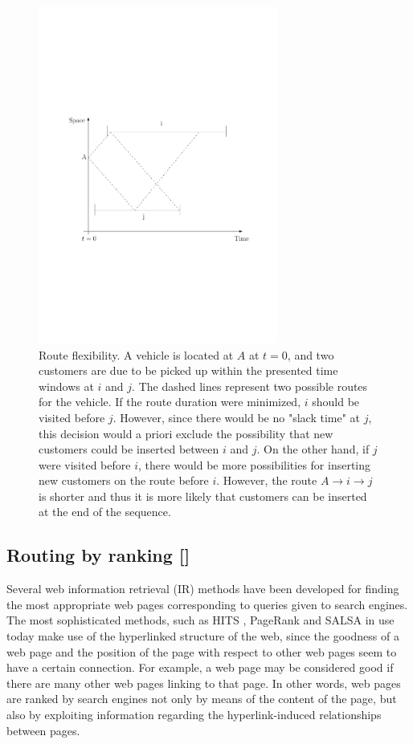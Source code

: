 \documentclass[dissertation,draft*]{aaltoseries}
\begin{document}
\begin{figure}[ht]
\begin{center}
\includegraphics[width=0.7\textwidth]{flexibility03.pdf}
\caption{Route flexibility. A vehicle is located at $A$ at $t = 0$,
and two customers are due to be picked up within the presented time windows at $i$ and $j$.
The dashed lines represent two possible routes for the vehicle.
If the route duration were minimized, $i$ should be visited before $j$. However, since
there would be no "slack time" at $j$, this decision would a priori 
exclude the possibility that new customers could be inserted between $i$ and $j$. 
On the other hand, if $j$ were visited before $i$, there would be
more possibilities for inserting new customers on the route before $i$. However, 
the route $A \to i \to j$ is shorter and thus it is more likely that 
customers can be inserted at the end of the sequence.}
\label{flexibility01}
\end{center}
\end{figure}



\subsection{Routing by ranking []}
\label{routingbyranking}
Several web information retrieval (IR) methods have been developed
for finding the most appropriate web pages corresponding to 
queries given to search engines. The most sophisticated methods, such as HITS \cite{kleinberg}, PageRank \cite{brin01} and SALSA \cite{lempel}
in use today make use of the hyperlinked structure of the web, since
the goodness of a web page and the position of the page with respect to
other web pages seem to have a certain connection. 
For example, a web page may be
considered good if there are many other web pages linking to that page. In other words, 
web pages are ranked by search engines not only by means of the content of the page, but
also by exploiting information regarding the hyperlink-induced relationships between pages.
\end{document}
